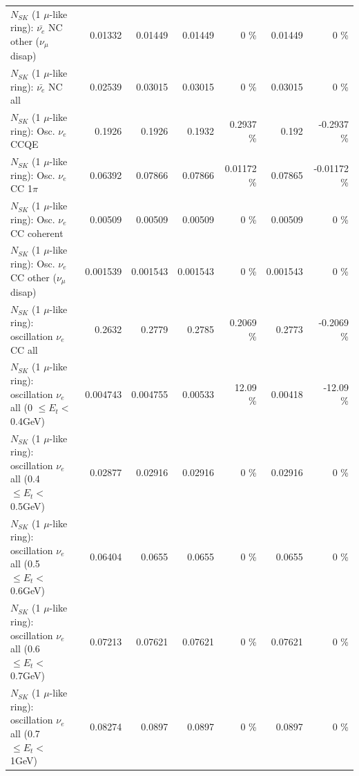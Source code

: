 \begin{table}
\begin{tabular}{| l | r | r | r  r | r  r |}
          $N_{SK}$ (1 $\mu$-like ring): $\bar{\nu_e}$ NC other ($\nu_\mu$ disap) &         0.01332 &         0.01449 &         0.01449 &        0 \%  &         0.01449 &        0 \%  \\ 
                            $N_{SK}$ (1 $\mu$-like ring): $\bar{\nu_{e}}$ NC all &         0.02539 &         0.03015 &         0.03015 &        0 \%  &         0.03015 &        0 \%  \\ 
\hline
\hline
\hline
                                 $N_{SK}$ (1 $\mu$-like ring): Osc. $\nu_e$ CCQE &          0.1926 &          0.1926 &          0.1932 &   0.2937 \%  &           0.192 &  -0.2937 \%  \\ 
                            $N_{SK}$ (1 $\mu$-like ring): Osc. $\nu_e$ CC 1$\pi$ &         0.06392 &         0.07866 &         0.07866 &  0.01172 \%  &         0.07865 & -0.01172 \%  \\ 
                          $N_{SK}$ (1 $\mu$-like ring): Osc. $\nu_e$ CC coherent &         0.00509 &         0.00509 &         0.00509 &        0 \%  &         0.00509 &        0 \%  \\ 
           $N_{SK}$ (1 $\mu$-like ring): Osc. $\nu_e$ CC other ($\nu_\mu$ disap) &        0.001539 &        0.001543 &        0.001543 &        0 \%  &        0.001543 &        0 \%  \\ 
                        $N_{SK}$ (1 $\mu$-like ring): oscillation $\nu_e$ CC all &          0.2632 &          0.2779 &          0.2785 &   0.2069 \%  &          0.2773 &  -0.2069 \%  \\ 
\hline
$N_{SK}$ (1 $\mu$-like ring): oscillation $\nu_{e}$ all (0 $\leq E_{t} <$ 0.4GeV) &        0.004743 &        0.004755 &         0.00533 &    12.09 \%  &         0.00418 &   -12.09 \%  \\ 
$N_{SK}$ (1 $\mu$-like ring): oscillation $\nu_{e}$ all (0.4 $\leq E_{t} <$ 0.5GeV) &         0.02877 &         0.02916 &         0.02916 &        0 \%  &         0.02916 &        0 \%  \\ 
$N_{SK}$ (1 $\mu$-like ring): oscillation $\nu_{e}$ all (0.5 $\leq E_{t} <$ 0.6GeV) &         0.06404 &          0.0655 &          0.0655 &        0 \%  &          0.0655 &        0 \%  \\ 
$N_{SK}$ (1 $\mu$-like ring): oscillation $\nu_{e}$ all (0.6 $\leq E_{t} <$ 0.7GeV) &         0.07213 &         0.07621 &         0.07621 &        0 \%  &         0.07621 &        0 \%  \\ 
$N_{SK}$ (1 $\mu$-like ring): oscillation $\nu_{e}$ all (0.7 $\leq E_{t} <$ 1GeV) &         0.08274 &          0.0897 &          0.0897 &        0 \%  &          0.0897 &        0 \%  \\ 

\end{tabular}
\end{table}
